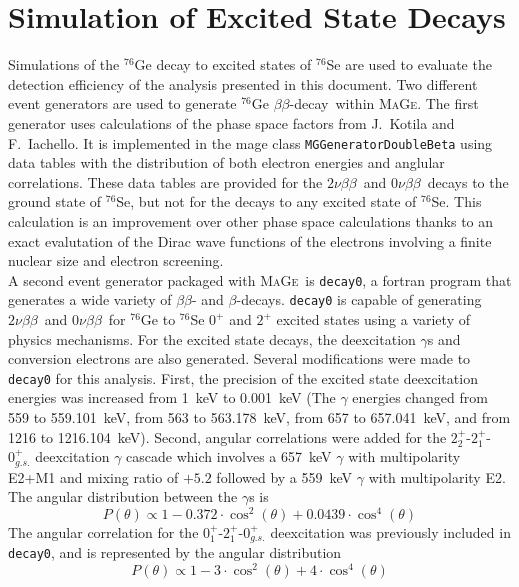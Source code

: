 \documentclass[notitlepage,rmp,aps,10pt]{revtex4-1}
\newcommand{\bb}{${\beta \beta}$}
\newcommand{\znbb}{${0 \nu \beta \beta}$}
\newcommand{\tnbb}{${2 \nu \beta \beta}$}
\newcommand{\Mage}{\textsc{MaGe}}
\newcommand{\iso}[2]{$^{#1}$#2}
\newcommand{\Ge}[1]{\iso{#1}{Ge}}
\newcommand{\Se}[1]{\iso{#1}{Se}}
\newcommand{\SP}[3]{$#1^{#2}_{#3}$}
\begin{document}
\section{Simulation of Excited State Decays} \label{sec:essims}
Simulations of the \Ge{76} decay to excited states of \Se{76} are used to evaluate the detection efficiency of the analysis presented in this document.
Two different event generators are used to generate \Ge{76} \bb-decay\ within \Mage.
The first generator uses calculations of the phase space factors from J.~Kotila and F.~Iachello\cite{Kotila2012}.
It is implemented in the mage class \texttt{MGGeneratorDoubleBeta} using data tables with the distribution of both electron energies and anglular correlations.
These data tables are provided for the \tnbb\ and \znbb\ decays to the ground state of \Se{76}, but not for the decays to any excited state of \Se{76}.
This calculation is an improvement over other phase space calculations thanks to an exact evalutation of the Dirac wave functions of the electrons involving a finite nuclear size and electron screening.
\\
A second event generator packaged with \Mage\ is \texttt{decay0}\cite{Ponkratenko2000}, a fortran program that generates a wide variety of $\beta\beta$- and $\beta$-decays.
\texttt{decay0} is capable of generating \tnbb\ and \znbb\ for \Ge{76} to \Se{76} \SP{0}{+}{} and \SP{2}{+}{} excited states using a variety of physics mechanisms.
For the excited state decays, the deexcitation $\gamma$s and conversion electrons are also generated.
Several modifications were made to \texttt{decay0} for this analysis.
First, the precision of the excited state deexcitation energies was increased from 1~keV to 0.001~keV (The $\gamma$ energies changed from 559 to 559.101~keV, from 563 to 563.178~keV, from 657 to 657.041~keV, and from 1216 to 1216.104~keV).
Second, angular correlations were added for the \SP{2}{+}{2}-\SP{2}{+}{1}-\SP{0}{+}{g.s.} deexcitation $\gamma$ cascade which involves a 657~keV $\gamma$ with multipolarity E2+M1 and mixing ratio of $+5.2$ followed by a 559~keV $\gamma$ with multipolarity E2\cite{SINGH1995}.
The angular distribution between the $\gamma$s is\cite{Evans1955}
\begin{equation}
  P(\theta)\propto 1-0.372\cdot\cos^2(\theta)+0.0439\cdot\cos^4(\theta)
\end{equation}
The angular correlation for the \SP{0}{+}{1}-\SP{2}{+}{1}-\SP{0}{+}{g.s.} deexcitation was previously included in \texttt{decay0}, and is represented by the angular distribution
\begin{equation}
  P(\theta)\propto 1-3\cdot\cos^2(\theta)+4\cdot\cos^4(\theta)
\end{equation}
\end{document}
